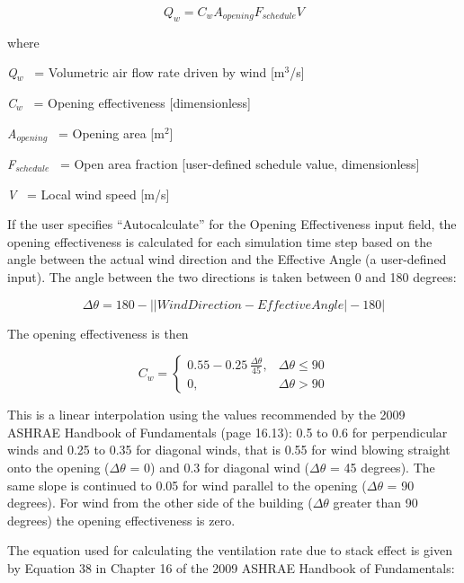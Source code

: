 \begin{equation}
{Q_w} = {C_w}{A_{opening}}{F_{schedule}}V
\end{equation}

where

\emph{Q\(_{w}\)}~ = Volumetric air flow rate driven by wind {[}m\(^{3}\)/s{]}

\emph{C\(_{w}\)}~ = Opening effectiveness {[}dimensionless{]}

\emph{A\(_{opening}\)}~ = Opening area {[}m\(^{2}\){]}

\emph{F\(_{schedule}\)}~ = Open area fraction {[}user-defined schedule value, dimensionless{]}

\emph{V}~ = Local wind speed {[}m/s{]}

If the user specifies ``Autocalculate'' for the Opening Effectiveness input field, the opening effectiveness is calculated for each simulation time step based on the angle between the actual wind direction and the Effective Angle (a user-defined input). The angle between the two directions is taken between 0 and 180 degrees:

\begin{equation}
\Delta\theta = 180 - \left| {\left| {WindDirection - EffectiveAngle} \right| - 180} \right|
\end{equation}

The opening effectiveness is then

\begin{equation}
{C_w} = \left\{ \begin{array}{ll} 0.55 - 0.25\,\frac{{\Delta\theta}}{{45}}, & \Delta\theta \le 90 \\ 0, & \Delta\theta > 90 \end{array}\right.
\end{equation}

This is a linear interpolation using the values recommended by the 2009 ASHRAE Handbook of Fundamentals (page 16.13): 0.5 to 0.6 for perpendicular winds and 0.25 to 0.35 for diagonal winds, that is 0.55 for wind blowing straight onto the opening ($\Delta\theta$ = 0) and 0.3 for diagonal wind ($\Delta\theta$ = 45 degrees). The same slope is continued to 0.05 for wind parallel to the opening ($\Delta\theta$ = 90 degrees). For wind from the other side of the building ($\Delta\theta$ greater than 90 degrees) the opening effectiveness is zero.

The equation used for calculating the ventilation rate due to stack effect is given by Equation 38 in Chapter 16 of the 2009 ASHRAE Handbook of Fundamentals:

